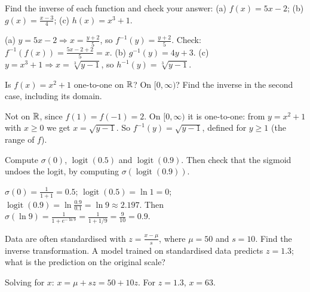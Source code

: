 \sectionexercises

\begin{exercise}
Find the inverse of each function and check your answer:
(a) $f(x) = 5x - 2$; (b) $g(x) = \frac{x - 3}{4}$; (c) $h(x) = x^3 + 1$.
\end{exercise}
\begin{solution}
(a) $y = 5x - 2 \Rightarrow x = \tfrac{y + 2}{5}$, so
$f^{-1}(y) = \tfrac{y+2}{5}$. Check: $f^{-1}(f(x)) = \tfrac{5x - 2 + 2}{5} = x$.
(b) $g^{-1}(y) = 4y + 3$. (c) $y = x^3 + 1 \Rightarrow x = \sqrt[3]{y - 1}$, so
$h^{-1}(y) = \sqrt[3]{y-1}$.
\end{solution}

\begin{exercise}
Is $f(x) = x^2 + 1$ one-to-one on $\mathbb{R}$? On $[0, \infty)$? Find the inverse in
the second case, including its domain.
\end{exercise}
\begin{solution}
Not on $\mathbb{R}$, since $f(1) = f(-1) = 2$. On $[0, \infty)$ it is one-to-one: from
$y = x^2 + 1$ with $x \ge 0$ we get $x = \sqrt{y - 1}$. So
$f^{-1}(y) = \sqrt{y-1}$, defined for $y \ge 1$ (the range of $f$).
\end{solution}

\begin{exercise}
Compute $\sigma(0)$, $\operatorname{logit}(0.5)$ and
$\operatorname{logit}(0.9)$. Then check that the sigmoid undoes the logit, by
computing $\sigma(\operatorname{logit}(0.9))$.
\end{exercise}
\begin{solution}
$\sigma(0) = \tfrac{1}{1+1} = 0.5$; $\operatorname{logit}(0.5) = \ln 1 = 0$;
$\operatorname{logit}(0.9) = \ln\tfrac{0.9}{0.1} = \ln 9 \approx 2.197$. Then
$\sigma(\ln 9) = \tfrac{1}{1 + e^{-\ln 9}} = \tfrac{1}{1 + 1/9} =
\tfrac{9}{10} = 0.9$.
\end{solution}

\begin{exercise}
Data are often standardised with $z = \frac{x - \mu}{s}$, where $\mu = 50$ and
$s = 10$. Find the inverse transformation. A model trained on standardised
data predicts $z = 1.3$; what is the prediction on the original scale?
\end{exercise}
\begin{solution}
Solving for $x$: $x = \mu + sz = 50 + 10z$. For $z = 1.3$, $x = 63$.
\end{solution}

